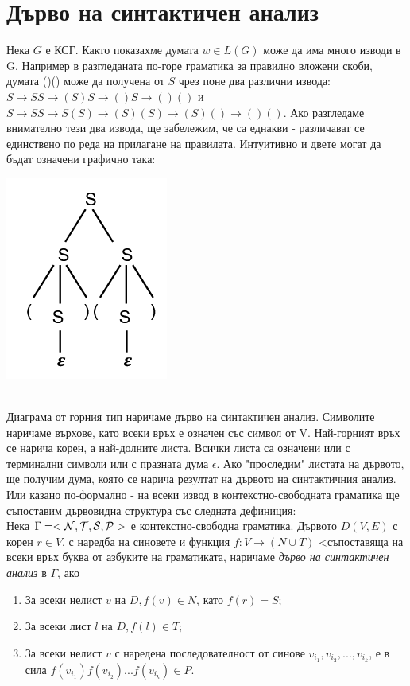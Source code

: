 \documentclass[11pt]{article}
\begin{document}
\section{Дърво на синтактичен анализ}
Нека $G$ е КСГ. Както показахме думата $w \in L(G)$ може да има много изводи в G. Например в разгледаната по-горе граматика за правилно вложени скоби, думата ()() може да получена от $S$ чрез поне два различни извода: $S \to SS \to (S)S \to ()S \to ()()$ и $S \to SS \to S(S) \to (S)(S) \to (S)() \to ()()$. Ако разгледаме внимателно тези два извода, ще забележим, че са еднакви - различават се единствено по реда на прилагане на правилата. Интуитивно и двете могат да бъдат означени графично така:\\
\centerline{\includegraphics[scale=0.5]{imgDTree.png}}\\
Диаграма от горния тип наричаме дърво на синтактичен анализ. Символите наричаме върхове, като всеки връх е означен със символ от V. Най-горният връх се нарича корен, а най-долните листа. Всички листа са означени или с терминални символи или с празната дума $\epsilon$. Ако "проследим" листата на дървото, ще получим дума, която се нарича резултат на дървото на синтактичния анализ.\\
Или казано по-формално - на всеки извод в контекстно-свободната граматика ще  съпоставим дървовидна структура със следната дефиниция:\\
 Нека $\Gamma = <\mathcal{N}, \mathcal{T}, \mathcal{S}, \mathcal{P}>$ е контекстно-свободна граматика. Дървото $D(V, E)$ с корен $r \in V$, с наредба на синовете и функция $f: V \to (N \cup T)$ <съпоставяща на всеки връх буква от азбуките на граматиката, наричаме \emph{дърво на синтактичен анализ} в $\Gamma$, ако 

\enumlet
\begin{enumerate}
	\item За всеки нелист $v$ на $D, f(v) \in N$, като $f(r) = S$;
	\item За всеки лист $l$ на $D, f(l) \in T$;
	\item За всеки нелист $v$ с наредена последователност от синове $v_{i_1}, v_{i_2}, ..., v_{i_k}$, е в сила $f(v_{i_1})f(v_{i_2})...f(v_{i_k})\in P$. 
\end{enumerate}
\end{document}
